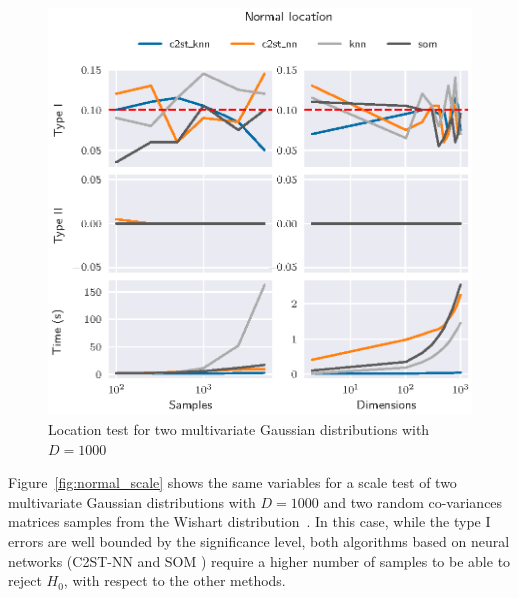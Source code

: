 \begin{figure}[htpb]
    \centering
    \includegraphics{images/4_som/normal_location}
    \caption{
    Location test for two multivariate Gaussian distributions with $D=1000$}
    \label{fig:normal_location}
\end{figure}

Figure~\ref{fig:normal_scale} shows the same variables for a scale test of two multivariate
Gaussian distributions with $D=1000$ and two random co-variances matrices samples from the
Wishart distribution~\cite{smith1972algorithm}. In this case, while the type I errors are
well bounded by the significance level, both algorithms based on neural networks
(C2ST-NN and \gls{SOM} ) require a higher number of samples to be able to reject $H_0$, with respect
to the other methods.

